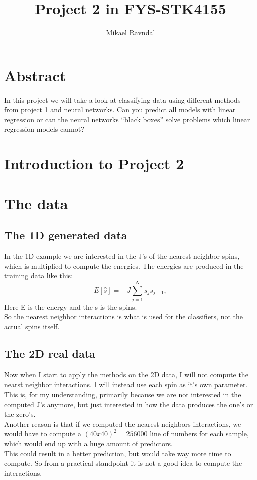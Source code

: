 \documentclass[a4paper,norsk]{article}
\title {Project 2 in FYS-STK4155}
\author {Mikael Ravndal}
\begin{document}
\maketitle
\section{Abstract}
In this project we will take a look at classifying data using different methods from project 1 and neural networks. Can you predict all models with linear regression or can the neural networks ``black boxes''  solve problems which linear regression models cannot?

\section{Introduction to Project 2}

\section{The data}
\subsection{The 1D generated data}
In the 1D example we are interested in the J's of the nearest neighbor spins, which is multiplied to compute the energies. The energies are produced in the training data like this:
\begin{equation*}
  E[\hat{s}]=-J\sum_{j=1}^{N}s_{j}s_{j+1},
\end{equation*}
Here E is the energy and the s is the spins.\\
So the nearest neighbor interactions is what is used for the classifiers, not the actual spins itself.
\subsection{The 2D real data}
Now when I start to apply the methods on the 2D data, I will not compute the nearst neighbor interactions. I will instead use each spin as it's own parameter. This is, for my understanding, primarily because we are not interested in the computed J's anymore, but just interested in how the data produces the one's or the zero's.\\
Another reason is that if we computed the nearest neighbors interactions, we would have to compute a $(40x40)^2 = 256000$ line of numbers for each sample, which would end up with a huge amount of predictors.\\
This could result in a better prediction, but would take way more time to compute. So from a practical standpoint it is not a good idea to compute the interactions.
\end{document}
